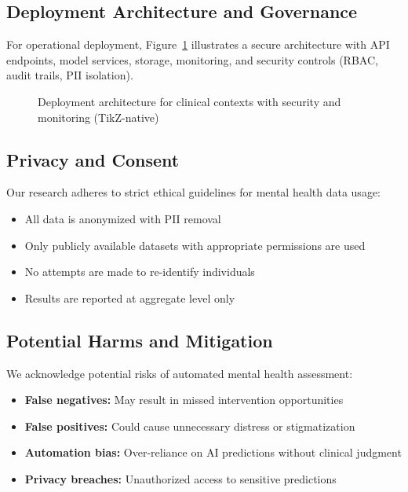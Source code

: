 \documentclass[conference]{IEEEtran}
\begin{document}
\subsection{Deployment Architecture and Governance}

For operational deployment, Figure~\ref{fig:deployment_arch} illustrates a secure architecture with API endpoints, model services, storage, monitoring, and security controls (RBAC, audit trails, PII isolation).

\begin{figure}[H]
    \centering
    \resizebox{\linewidth}{!}{\DeploymentArchitectureDiagram}
    \caption{Deployment architecture for clinical contexts with security and monitoring (TikZ-native)}
    \label{fig:deployment_arch}
\end{figure}

\subsection{Privacy and Consent}

Our research adheres to strict ethical guidelines for mental health data usage:
\begin{itemize}
    \item All data is anonymized with PII removal
    \item Only publicly available datasets with appropriate permissions are used
    \item No attempts are made to re-identify individuals
    \item Results are reported at aggregate level only
\end{itemize}

\subsection{Potential Harms and Mitigation}

We acknowledge potential risks of automated mental health assessment:
\begin{itemize}
    \item \textbf{False negatives:} May result in missed intervention opportunities
    \item \textbf{False positives:} Could cause unnecessary distress or stigmatization
    \item \textbf{Automation bias:} Over-reliance on AI predictions without clinical judgment
    \item \textbf{Privacy breaches:} Unauthorized access to sensitive predictions
\end{itemize}
\end{document}

